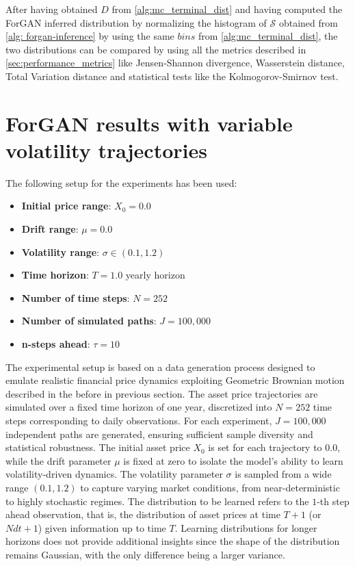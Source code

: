After having obtained $D$ from \ref{alg:mc_terminal_dist} and having computed the ForGAN inferred distribution by normalizing the histogram of $\mathcal{S}$ obtained from \ref{alg: forgan-inference} by using the same $bins$ from \ref{alg:mc_terminal_dist},
the two distributions can be compared by using all the metrics described in \ref{sec:performance_metrics} like Jensen-Shannon divergence, Wasserstein distance, Total Variation distance and statistical tests like the Kolmogorov-Smirnov test.


\section{ForGAN results with variable volatility trajectories}
\label{sec:bs experiment}
The following setup for the experiments has been used:\\
\begin{itemize}
    \item \textbf{Initial price range}: $X_0 = 0.0$
    \item \textbf{Drift range}: $\mu = 0.0$
    \item \textbf{Volatility range}: $\sigma \in (0.1, 1.2)$
    \item \textbf{Time horizon}: $T = 1.0 $ yearly horizon
    \item \textbf{Number of time steps}: $N = 252$
    \item \textbf{Number of simulated paths}: $J = 100{,}000$
    \item \textbf{n-steps ahead}: $\tau = 10$
\end{itemize}

The experimental setup is based on a data generation process designed to emulate realistic financial price dynamics exploiting Geometric Brownian motion described in the before in previous section. 
The asset price trajectories are simulated over a fixed time horizon of one year, discretized into $N=252$ time steps corresponding to daily observations.
For each experiment, $J=100{,}000$ independent paths are generated, ensuring sufficient sample diversity and statistical robustness.
The initial asset price $X_0$ is set for each trajectory to $0.0$, while the drift parameter $\mu$ is fixed at zero to isolate the model's ability to learn volatility-driven dynamics.
The volatility parameter $\sigma$ is sampled from a wide range $(0.1, 1.2)$ to capture varying market conditions, from near-deterministic to highly stochastic regimes.
The distribution to be learned refers to the $1$-th step ahead observation, that is, the distribution of asset prices at time $T + 1$ (or $N dt + 1$) given information up to time $T$. 
Learning distributions for longer horizons does not provide additional insights since the shape of the distribution remains Gaussian, with the only difference being a larger variance.\\

